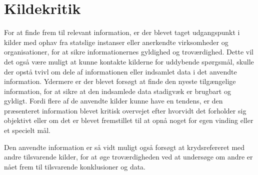 \section{Kildekritik}
For at finde frem til relevant information, er der blevet taget udgangspunkt i kilder med ophav fra statslige instanser eller anerkendte virksomheder og organisationer, for at sikre informationernes gyldighed og troværdighed. Dette vil det også være muligt at kunne kontakte kilderne for uddybende spørgsmål, skulle der opstå tvivl om dele af informationen eller indsamlet data i det anvendte information. Ydermere er der blevet forsøgt at finde den nyeste tilgængelige information, for at sikre at den indsamlede data stadigvæk er brugbart og gyldigt. Fordi flere af de anvendte kilder kunne have en tendens, er den præsenteret information blevet kritisk overvejet efter hvorvidt det forholder sig objektivt eller om det er blevet fremstillet til at opnå noget for egen vinding eller et specielt mål.


 Den anvendte information er så vidt muligt også forsøgt at krydsrefereret med andre tilsvarende kilder, for at øge troværdigheden ved at undersøge om andre er nået frem til tilsvarende konklusioner og data.
